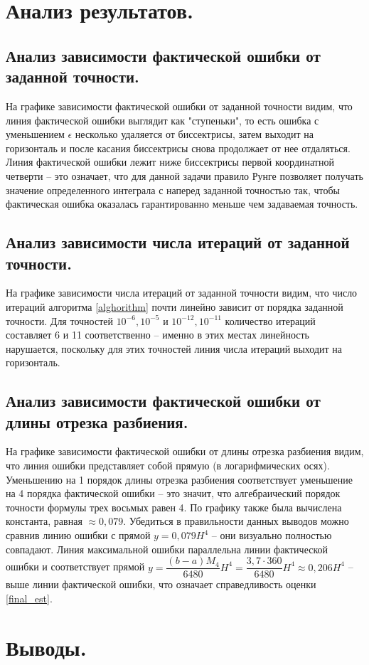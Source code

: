 \documentclass[a4paper, 12pt]{article}
\begin{document}
	\section{Анализ результатов.}
	
	\subsection{Анализ зависимости фактической ошибки от заданной точности.} 
	
	На графике зависимости фактической ошибки от заданной точности видим, что линия фактической ошибки выглядит как "ступеньки", то есть ошибка с уменьшением $\epsilon$ несколько удаляется от биссектрисы, затем выходит на горизонталь и после касания биссектрисы снова продолжает от нее отдаляться. Линия фактической ошибки лежит ниже биссектрисы первой координатной четверти -- это означает, что для данной задачи правило Рунге позволяет получать значение определенного интеграла с наперед заданной точностью так, чтобы фактическая ошибка оказалась гарантированно меньше чем задаваемая точность. 
	
	\subsection{Анализ зависимости числа итераций от заданной точности.}
	
	На графике зависимости числа итераций от заданной точности видим, что число итераций алгоритма \ref{alghorithm} почти линейно зависит от порядка заданной точности. Для точностей $10^{-6},10^{-5}$ и $10^{-12},10^{-11}$ количество итераций составляет 6 и 11 соответственно -- именно в этих местах линейность нарушается, поскольку для этих точностей линия числа итераций выходит на горизонталь.
	
	\subsection{Анализ зависимости фактической ошибки от длины отрезка разбиения.}
	
	На графике зависимости фактической ошибки от длины отрезка разбиения видим, что линия ошибки представляет собой прямую (в логарифмических осях). Уменьшению на 1 порядок длины отрезка разбиения соответствует уменьшение на 4 порядка фактической ошибки -- это значит, что алгебраический порядок точности формулы трех восьмых равен 4. По графику также была вычислена константа, равная $\approx 0,079$. Убедиться в правильности данных выводов можно сравнив линию ошибки с прямой $y=0,079H^4$ -- они визуально полностью совпадают. Линия максимальной ошибки параллельна линии фактической ошибки и соответствует прямой $y=\dfrac{(b-a)M_4}{6480}H^4=\dfrac{3,7\cdot360}{6480}H^4\approx0,206H^4$ -- выше линии фактической ошибки, что означает справедливость оценки \eqref{final_est}.
	
	\section{Выводы.}
	
	\begin{itemize}
		
	\end{itemize}
	
\end{document}
